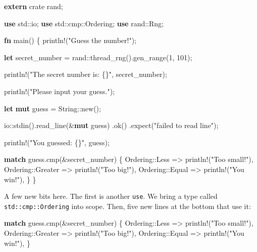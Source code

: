 \documentclass[a4paper,]{book}
\newenvironment{Shaded}{\begin{snugshade}}{\end{snugshade}}
\newcommand{\KeywordTok}[1]{\textcolor[rgb]{0.13,0.29,0.53}{\textbf{{#1}}}}
\newcommand{\DecValTok}[1]{\textcolor[rgb]{0.00,0.00,0.81}{{#1}}}
\newcommand{\StringTok}[1]{\textcolor[rgb]{0.31,0.60,0.02}{{#1}}}
\newcommand{\OtherTok}[1]{\textcolor[rgb]{0.56,0.35,0.01}{{#1}}}
\newcommand{\NormalTok}[1]{{#1}}
\begin{document}
\begin{Shaded}
\begin{Highlighting}[]
\KeywordTok{extern} \NormalTok{crate rand;}

\KeywordTok{use} \NormalTok{std::io;}
\KeywordTok{use} \NormalTok{std::cmp::Ordering;}
\KeywordTok{use} \NormalTok{rand::Rng;}

\KeywordTok{fn} \NormalTok{main() \{}
    \OtherTok{println!}\NormalTok{(}\StringTok{"Guess the number!"}\NormalTok{);}

    \KeywordTok{let} \NormalTok{secret_number = rand::thread_rng().gen_range(}\DecValTok{1}\NormalTok{, }\DecValTok{101}\NormalTok{);}

    \OtherTok{println!}\NormalTok{(}\StringTok{"The secret number is: \{\}"}\NormalTok{, secret_number);}

    \OtherTok{println!}\NormalTok{(}\StringTok{"Please input your guess."}\NormalTok{);}

    \KeywordTok{let} \KeywordTok{mut} \NormalTok{guess = String::new();}

    \NormalTok{io::stdin().read_line(&}\KeywordTok{mut} \NormalTok{guess)}
        \NormalTok{.ok()}
        \NormalTok{.expect(}\StringTok{"failed to read line"}\NormalTok{);}

    \OtherTok{println!}\NormalTok{(}\StringTok{"You guessed: \{\}"}\NormalTok{, guess);}

    \KeywordTok{match} \NormalTok{guess.cmp(&secret_number) \{}
        \NormalTok{Ordering::Less    => }\OtherTok{println!}\NormalTok{(}\StringTok{"Too small!"}\NormalTok{),}
        \NormalTok{Ordering::Greater => }\OtherTok{println!}\NormalTok{(}\StringTok{"Too big!"}\NormalTok{),}
        \NormalTok{Ordering::Equal   => }\OtherTok{println!}\NormalTok{(}\StringTok{"You win!"}\NormalTok{),}
    \NormalTok{\}}
\NormalTok{\}}
\end{Highlighting}
\end{Shaded}

A few new bits here. The first is another \texttt{use}. We bring a type
called \texttt{std::cmp::Ordering} into scope. Then, five new lines at
the bottom that use it:

\begin{Shaded}
\begin{Highlighting}[]
\KeywordTok{match} \NormalTok{guess.cmp(&secret_number) \{}
    \NormalTok{Ordering::Less    => }\OtherTok{println!}\NormalTok{(}\StringTok{"Too small!"}\NormalTok{),}
    \NormalTok{Ordering::Greater => }\OtherTok{println!}\NormalTok{(}\StringTok{"Too big!"}\NormalTok{),}
    \NormalTok{Ordering::Equal   => }\OtherTok{println!}\NormalTok{(}\StringTok{"You win!"}\NormalTok{),}
\NormalTok{\}}
\end{Highlighting}
\end{Shaded}
\end{document}
